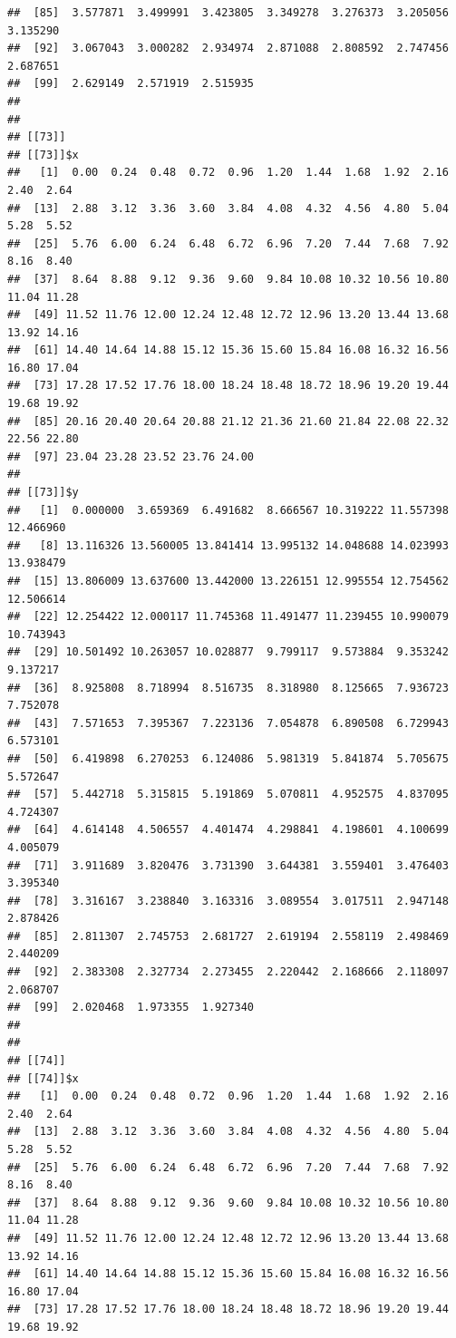 \documentclass[
  ignorenonframetext,
]{beamer}
\begin{document}
\begin{frame}[fragile]{}
\begin{verbatim}
##  [85]  3.577871  3.499991  3.423805  3.349278  3.276373  3.205056  3.135290
##  [92]  3.067043  3.000282  2.934974  2.871088  2.808592  2.747456  2.687651
##  [99]  2.629149  2.571919  2.515935
## 
## 
## [[73]]
## [[73]]$x
##   [1]  0.00  0.24  0.48  0.72  0.96  1.20  1.44  1.68  1.92  2.16  2.40  2.64
##  [13]  2.88  3.12  3.36  3.60  3.84  4.08  4.32  4.56  4.80  5.04  5.28  5.52
##  [25]  5.76  6.00  6.24  6.48  6.72  6.96  7.20  7.44  7.68  7.92  8.16  8.40
##  [37]  8.64  8.88  9.12  9.36  9.60  9.84 10.08 10.32 10.56 10.80 11.04 11.28
##  [49] 11.52 11.76 12.00 12.24 12.48 12.72 12.96 13.20 13.44 13.68 13.92 14.16
##  [61] 14.40 14.64 14.88 15.12 15.36 15.60 15.84 16.08 16.32 16.56 16.80 17.04
##  [73] 17.28 17.52 17.76 18.00 18.24 18.48 18.72 18.96 19.20 19.44 19.68 19.92
##  [85] 20.16 20.40 20.64 20.88 21.12 21.36 21.60 21.84 22.08 22.32 22.56 22.80
##  [97] 23.04 23.28 23.52 23.76 24.00
## 
## [[73]]$y
##   [1]  0.000000  3.659369  6.491682  8.666567 10.319222 11.557398 12.466960
##   [8] 13.116326 13.560005 13.841414 13.995132 14.048688 14.023993 13.938479
##  [15] 13.806009 13.637600 13.442000 13.226151 12.995554 12.754562 12.506614
##  [22] 12.254422 12.000117 11.745368 11.491477 11.239455 10.990079 10.743943
##  [29] 10.501492 10.263057 10.028877  9.799117  9.573884  9.353242  9.137217
##  [36]  8.925808  8.718994  8.516735  8.318980  8.125665  7.936723  7.752078
##  [43]  7.571653  7.395367  7.223136  7.054878  6.890508  6.729943  6.573101
##  [50]  6.419898  6.270253  6.124086  5.981319  5.841874  5.705675  5.572647
##  [57]  5.442718  5.315815  5.191869  5.070811  4.952575  4.837095  4.724307
##  [64]  4.614148  4.506557  4.401474  4.298841  4.198601  4.100699  4.005079
##  [71]  3.911689  3.820476  3.731390  3.644381  3.559401  3.476403  3.395340
##  [78]  3.316167  3.238840  3.163316  3.089554  3.017511  2.947148  2.878426
##  [85]  2.811307  2.745753  2.681727  2.619194  2.558119  2.498469  2.440209
##  [92]  2.383308  2.327734  2.273455  2.220442  2.168666  2.118097  2.068707
##  [99]  2.020468  1.973355  1.927340
## 
## 
## [[74]]
## [[74]]$x
##   [1]  0.00  0.24  0.48  0.72  0.96  1.20  1.44  1.68  1.92  2.16  2.40  2.64
##  [13]  2.88  3.12  3.36  3.60  3.84  4.08  4.32  4.56  4.80  5.04  5.28  5.52
##  [25]  5.76  6.00  6.24  6.48  6.72  6.96  7.20  7.44  7.68  7.92  8.16  8.40
##  [37]  8.64  8.88  9.12  9.36  9.60  9.84 10.08 10.32 10.56 10.80 11.04 11.28
##  [49] 11.52 11.76 12.00 12.24 12.48 12.72 12.96 13.20 13.44 13.68 13.92 14.16
##  [61] 14.40 14.64 14.88 15.12 15.36 15.60 15.84 16.08 16.32 16.56 16.80 17.04
##  [73] 17.28 17.52 17.76 18.00 18.24 18.48 18.72 18.96 19.20 19.44 19.68 19.92

\end{verbatim}
\end{frame}
\end{document}

